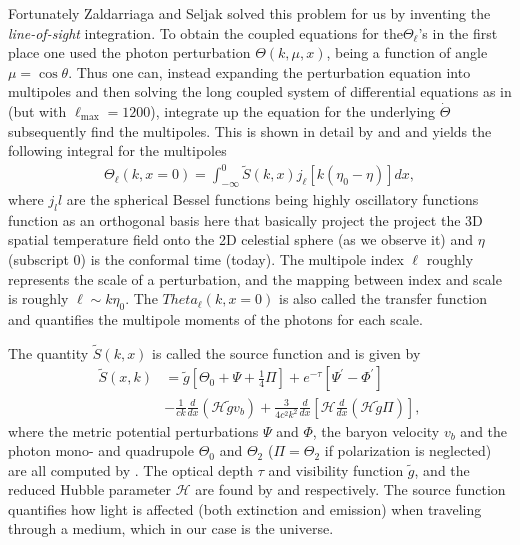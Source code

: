 \documentclass[twocolumn]{aastex62}
\begin{document}
Fortunately Zaldarriaga and Seljak solved this problem for us by inventing the \textit{line-of-sight} integration. To obtain the coupled equations for the$ \Theta_\ell$'s in the first place one used the photon perturbation $\Theta(k, \mu, x)$, being a function of angle $\mu = \cos \theta$. Thus one can, instead expanding the perturbation equation into multipoles and then solving the long coupled system of differential equations as in \cite{stutzer:2020c} (but with $\ell_\text{max} = 1200$), integrate up the equation for the underlying $\dot{\Theta}$ subsequently find the multipoles. This is shown in detail by \cite{callin:2006} and \cite{dodelson:2003} and yields the following integral for the multipoles 
\begin{align}
    \Theta_\ell(k, x=0) = \int_{-\infty}^{0} \tilde{S}(k,x)
              j_\ell[k(\eta_0-\eta)] dx,
    \label{eq:transfer}
\end{align} 
where $j_ll$ are the spherical Bessel functions being highly oscillatory functions function as an orthogonal basis here that basically project the project the 3D spatial temperature field onto the 2D celestial sphere (as we observe it) and $\eta$ (subscript 0) is the conformal time (today). The multipole index $\ell$ roughly represents the scale of a perturbation, and the mapping between index and scale is roughly $\ell\sim k\eta_0$. The $Theta_\ell(k, x = 0)$ is also called the transfer function and quantifies the multipole moments of the photons for each scale.

The quantity $\tilde{S}(k,x)$ is called the source function and is given by
\begin{align}
    \tilde{S}(x, k) &= \tilde{g}\left[ \Theta_0 + \Psi + \frac{1}{4}\Pi\right] + e^{-\tau} \left[\Psi^\prime-\Phi^\prime\right] \nonumber\\
    &- \frac{1}{ck}\frac{d}{dx}(\mathcal{H}\tilde{g}v_b) + \frac{3}{4c^2k^2} \frac{d}{dx} \left[\mathcal{H}\frac{d}{dx} (\mathcal{H}\tilde{g}\Pi)\right],
    \label{eq:source}
\end{align}
where the metric potential perturbations $\Psi$ and $\Phi$, the baryon velocity $v_b$ and the photon mono- and quadrupole $\Theta_0$ and $\Theta_2$ ($\Pi = \Theta_2$ if polarization is neglected) are all computed by \cite{stutzer:2020c}. The optical depth $\tau$ and visibility function $\tilde{g}$, and the reduced Hubble parameter $\mathcal{H}$ are found by \cite{stutzer:2020b} and \cite{stutzer:2020a} respectively. The source function quantifies how light is affected (both extinction and emission) when traveling through a medium, which in our case is the universe.
\end{document}
